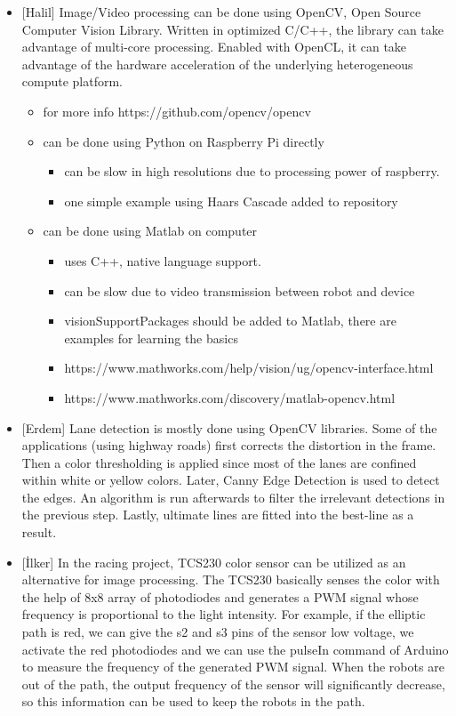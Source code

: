 \documentclass[a4paper,12pt]{article}
\begin{document}
\begin{itemize}
\begin{itemize}
		\end{itemize}
	\item {[Halil]} Image/Video processing can be done using OpenCV, Open Source Computer Vision Library. Written in optimized C/C++, the library can take advantage of multi-core processing. Enabled with OpenCL, it can take advantage of the hardware acceleration of the underlying heterogeneous compute platform.
		\begin{itemize}
			\item for more info https://github.com/opencv/opencv
			\item can be done using Python on Raspberry Pi directly
				\begin{itemize}
					\item can be slow in high resolutions due to processing power of raspberry.
					\item one simple example using Haars Cascade added to repository
				\end{itemize}
			\item can be done using Matlab on computer
				\begin{itemize}
					\item uses C++, native language support.
					\item can be slow due to video transmission between robot and device
					\item visionSupportPackages should be added to Matlab, there are examples for learning the basics
					\item https://www.mathworks.com/help/vision/ug/opencv-interface.html
					\item https://www.mathworks.com/discovery/matlab-opencv.html
				\end{itemize}
		\end{itemize}
	\item {[Erdem]} Lane detection is mostly done using OpenCV libraries. Some of the applications (using highway roads) first corrects the distortion in the frame. Then a color thresholding is applied since most of the lanes are confined within white or yellow colors. Later, Canny Edge Detection is used to detect the edges. An algorithm is run afterwards to filter the irrelevant detections in the previous step. Lastly, ultimate lines are fitted into the best-line as a result.
	
	\item {[İlker]} In the racing project, TCS230 color sensor can be utilized as an alternative for image processing. The TCS230 basically senses the color with the help of 8x8 array of photodiodes and generates a PWM signal whose frequency is proportional to the light intensity. For example, if the elliptic path is red, we can give the s2 and s3 pins of the sensor low voltage, we activate the red photodiodes and we can use the pulseIn command of Arduino to measure the frequency of the generated PWM signal. When the robots are out of the path, the output frequency of the sensor will significantly decrease, so this information can be used to keep the robots in the path.  	  



\end{itemize}
\end{document}
